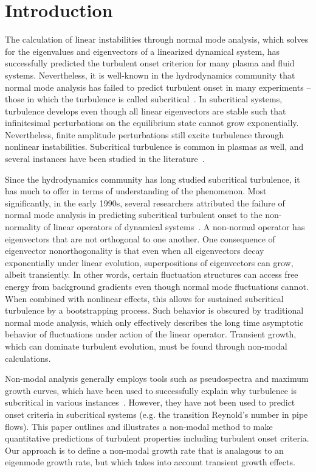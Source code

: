\documentclass[twocolumn,showkeys,superscriptaddress]{revtex4}
\begin{document}
\section{Introduction}

The calculation of linear instabilities through normal mode analysis, which solves for the eigenvalues and eigenvectors of a linearized dynamical system,
has successfully predicted the turbulent onset criterion for many plasma and fluid systems.
Nevertheless, it is well-known in the hydrodynamics community that normal mode analysis has failed to predict turbulent onset in many experiments -- those in which the
turbulence is called subcritical~\cite{drazin1981}. 
In subcritical systems, turbulence develops even though all linear eigenvectors are stable such that infinitesimal perturbations on the equilibrium state cannot grow exponentially. 
Nevertheless, finite amplitude perturbations still excite turbulence through nonlinear instabilities.
Subcritical turbulence is common in plasmas as well, and several instances have been studied in the literature~\cite{waltz1985,scott1990,nordman1993,biskamp1995,drake1995,itoh1996,camargo1998,krommes1999,camporeale2009,schekochihin2012,highcock2012}. 

Since the hydrodynamics community has long studied subcritical turbulence, it has much to offer in terms of understanding of the phenomenon. Most significantly,
in the early 1990s, several researchers attributed the failure of normal mode analysis in predicting subcritical turbulent onset to the non-normality of linear operators of
dynamical systems~\cite{gustavsson1991,butler1992,trefethen1993,reddy1993,henningson1994,schmid2007}. A non-normal operator has 
eigenvectors that are not orthogonal to one another. One consequence of eigenvector nonorthogonality is that even when all eigenvectors decay exponentially under linear evolution, 
superpositions of eigenvectors can grow, albeit transiently.
In other words, certain fluctuation structures can access free energy from background gradients even though normal mode fluctuations cannot.
When combined with nonlinear effects, this allows for sustained subcritical turbulence by a bootstrapping process.
Such behavior is obscured by traditional normal mode analysis, which only effectively describes the long time asymptotic behavior of fluctuations under  
action of the linear operator. Transient growth, which can dominate turbulent evolution, must be found through non-modal calculations.

Non-modal analysis generally employs tools such as pseudospectra and maximum growth curves, which have been used to successfully explain
why turbulence is subcritical in various instances~\cite{trefethen1993,camargo1998}. 
However, they have not been used to predict onset criteria in subcritical systems (e.g. the transition Reynold's number in pipe flows).
This paper outlines and illustrates a non-modal method to make quantitative predictions of turbulent properties including turbulent onset criteria. 
Our approach is to define a non-modal growth rate that is analagous to an eigenmode growth rate, but which takes into account transient growth effects. 
\end{document}
